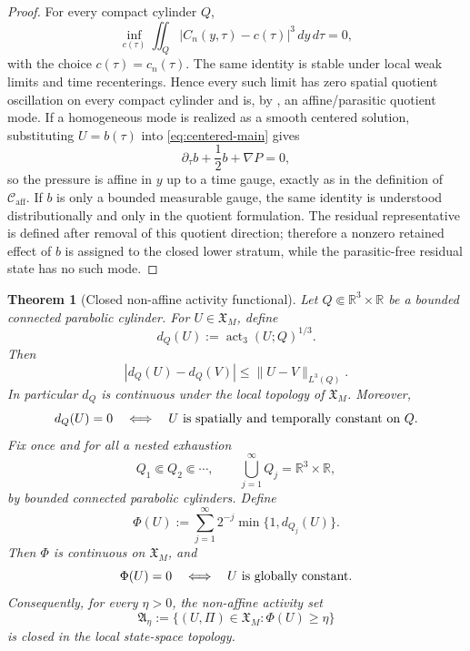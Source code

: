 \documentclass[11pt]{amsart}
\numberwithin{equation}{section}
\theoremstyle{plain}
\newtheorem{theorem}{Theorem}[section]
\theoremstyle{definition}
\theoremstyle{remark}
\newcommand{\Caff}{\mathcal C_{\mathrm{aff}}}
\newcommand{\actthree}{\operatorname{act}_3}
\begin{document}
\begin{proof}
For every compact cylinder \(Q\),
\[
   \inf_{c(\tau)}
   \iint_Q |C_n(y,\tau)-c(\tau)|^3\,dy\,d\tau=0,
\]
with the choice \(c(\tau)=c_n(\tau)\).  The same identity is stable under local
weak limits and time recenterings.  Hence every such limit has zero spatial
quotient oscillation on every compact cylinder and is, by
, an affine/parasitic quotient mode.
If a homogeneous mode is realized as a smooth centered solution, substituting
\(U=b(\tau)\) into \eqref{eq:centered-main} gives
\[
   \partial_\tau b+\frac12b+\nabla P=0,
\]
so the pressure is affine in \(y\) up to a time gauge, exactly as in the
definition of \(\Caff\).  If \(b\) is only a bounded measurable gauge, the same
identity is understood distributionally and only in the quotient formulation.
The residual representative is defined after removal of this quotient
direction; therefore a nonzero retained effect of \(b\) is assigned to the
closed lower stratum, while the parasitic-free residual state has no such mode.
\end{proof}

\begin{theorem}[Closed non-affine activity functional]
\label{thm:closed-nonaffine-activity}
Let \(Q\Subset\mathbb R^3\times\mathbb R\) be a bounded connected parabolic
cylinder.  For \(U\in\mathfrak X_M\), define
\[
   d_Q(U)
   :=
   \actthree(U;Q)^{1/3}.
\]
Then
\[
   |d_Q(U)-d_Q(V)|
   \le
   \|U-V\|_{L^3(Q)} .
\]
In particular \(d_Q\) is continuous under the local topology of
\(\mathfrak X_M\).  Moreover,
\[
   d_Q(U)=0
   \quad\Longleftrightarrow\quad
   U \hbox{ is spatially and temporally constant on } Q .
\]
Fix once and for all a nested exhaustion
\[
   Q_1\Subset Q_2\Subset\cdots,\qquad
   \bigcup_{j=1}^{\infty}Q_j=\mathbb R^3\times\mathbb R,
\]
by bounded connected parabolic cylinders.  Define
\[
   \Phi(U)
   :=
   \sum_{j=1}^{\infty}2^{-j}\min\{1,d_{Q_j}(U)\}.
\]
Then \(\Phi\) is continuous on \(\mathfrak X_M\), and
\[
   \Phi(U)=0
   \quad\Longleftrightarrow\quad
   U \hbox{ is globally constant}.
\]
Consequently, for every \(\eta>0\), the non-affine activity set
\[
   \mathfrak A_\eta
   :=
   \{(U,\Pi)\in\mathfrak X_M:\Phi(U)\ge\eta\}
\]
is closed in the local state-space topology.
\end{theorem}
\end{document}
